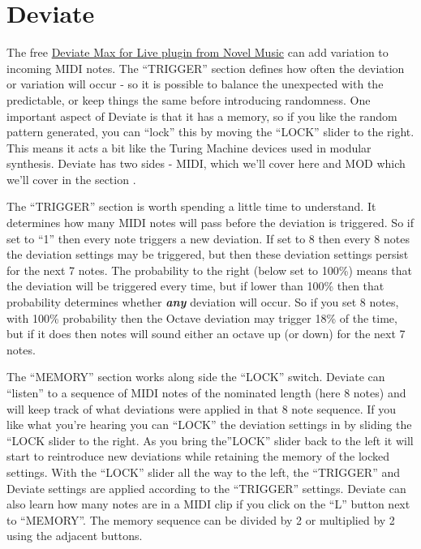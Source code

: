 \documentclass[
  12pt,
  letterpaper,
  oneside,
  open=any]{scrbook}
\begin{document}
\section{Deviate}\label{deviate}

The free \href{https://www.novelmusic.org/m4l/deviate}{Deviate Max for
Live plugin from Novel Music} can add variation to incoming MIDI notes.
The ``TRIGGER'' section defines how often the deviation or variation
will occur - so it is possible to balance the unexpected with the
predictable, or keep things the same before introducing randomness. One
important aspect of Deviate is that it has a memory, so if you like the
random pattern generated, you can ``lock'' this by moving the ``LOCK''
slider to the right. This means it acts a bit like the Turing Machine
devices used in modular synthesis. Deviate has two sides - MIDI, which
we'll cover here and MOD which we'll cover in the section .

The ``TRIGGER'' section is worth spending a little time to understand.
It determines how many MIDI notes will pass before the deviation is
triggered. So if set to ``1'' then every note triggers a new deviation.
If set to 8 then every 8 notes the deviation settings may be triggered,
but then these deviation settings persist for the next 7 notes. The
probability to the right (below set to 100\%) means that the deviation
will be triggered every time, but if lower than 100\% then that
probability determines whether \textbf{\emph{any}} deviation will occur.
So if you set 8 notes, with 100\% probability then the Octave deviation
may trigger 18\% of the time, but if it does then notes will sound
either an octave up (or down) for the next 7 notes.

The ``MEMORY'' section works along side the ``LOCK'' switch. Deviate can
``listen'' to a sequence of MIDI notes of the nominated length (here 8
notes) and will keep track of what deviations were applied in that 8
note sequence. If you like what you're hearing you can ``LOCK'' the
deviation settings in by sliding the ``LOCK slider to the right. As you
bring the''LOCK'' slider back to the left it will start to reintroduce
new deviations while retaining the memory of the locked settings. With
the ``LOCK'' slider all the way to the left, the ``TRIGGER'' and Deviate
settings are applied according to the ``TRIGGER'' settings. Deviate can
also learn how many notes are in a MIDI clip if you click on the ``L''
button next to ``MEMORY''. The memory sequence can be divided by 2 or
multiplied by 2 using the adjacent buttons.
\end{document}

